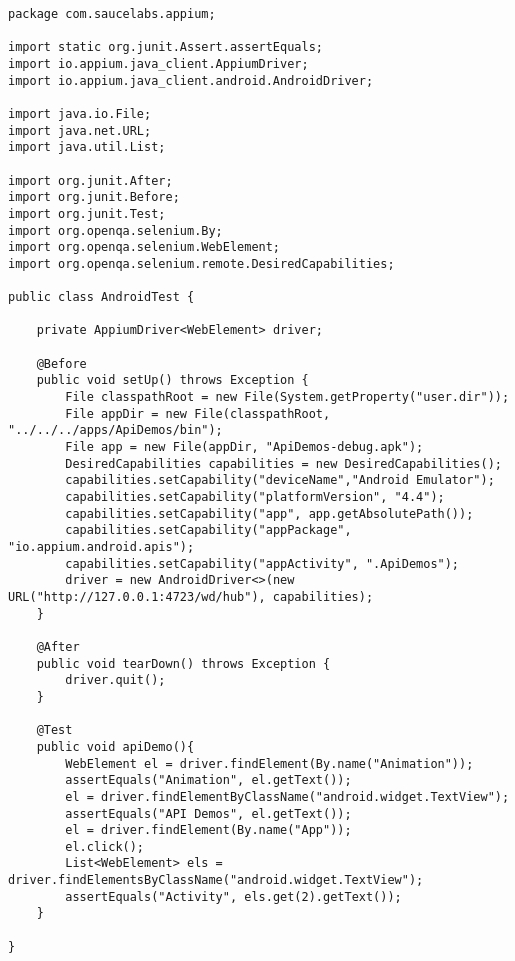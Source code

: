 \documentclass{article}
\begin{document}
\begin{lstlisting}[tabsize=2] % Java
package com.saucelabs.appium;

import static org.junit.Assert.assertEquals;
import io.appium.java_client.AppiumDriver;
import io.appium.java_client.android.AndroidDriver;

import java.io.File;
import java.net.URL;
import java.util.List;

import org.junit.After;
import org.junit.Before;
import org.junit.Test;
import org.openqa.selenium.By;
import org.openqa.selenium.WebElement;
import org.openqa.selenium.remote.DesiredCapabilities;

public class AndroidTest {

    private AppiumDriver<WebElement> driver;

    @Before
    public void setUp() throws Exception {
        File classpathRoot = new File(System.getProperty("user.dir"));
        File appDir = new File(classpathRoot, "../../../apps/ApiDemos/bin");
        File app = new File(appDir, "ApiDemos-debug.apk");
        DesiredCapabilities capabilities = new DesiredCapabilities();
        capabilities.setCapability("deviceName","Android Emulator");
        capabilities.setCapability("platformVersion", "4.4");
        capabilities.setCapability("app", app.getAbsolutePath());
        capabilities.setCapability("appPackage", "io.appium.android.apis");
        capabilities.setCapability("appActivity", ".ApiDemos");
        driver = new AndroidDriver<>(new URL("http://127.0.0.1:4723/wd/hub"), capabilities);
    }

    @After
    public void tearDown() throws Exception {
        driver.quit();
    }

    @Test
    public void apiDemo(){
        WebElement el = driver.findElement(By.name("Animation"));
        assertEquals("Animation", el.getText());
        el = driver.findElementByClassName("android.widget.TextView");
        assertEquals("API Demos", el.getText());
        el = driver.findElement(By.name("App"));
        el.click();
        List<WebElement> els = driver.findElementsByClassName("android.widget.TextView");
        assertEquals("Activity", els.get(2).getText());
    }

}
\end{lstlisting}
\end{document}

